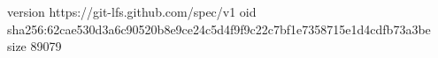 version https://git-lfs.github.com/spec/v1
oid sha256:62cae530d3a6c90520b8e9ce24c5d4f9f9c22c7bf1e7358715e1d4cdfb73a3be
size 89079
